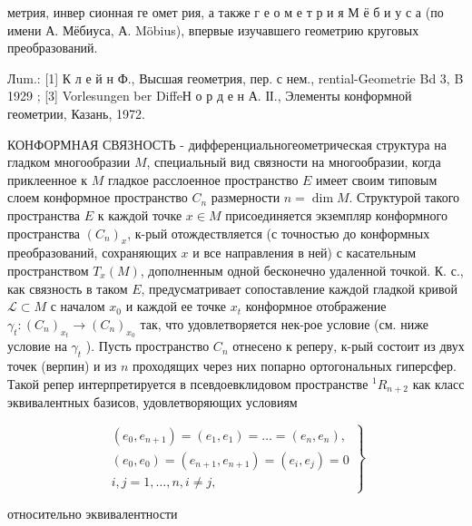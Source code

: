 \documentclass[10pt]{article}
\begin{document}
метрия, инвер сионная ге омет рия, а также г е о м е т р и я $М$ ё б и у с а (по имени А. Мёбиуса, А. Möbius), впервые изучавшего геометрию круговых преобразований.



Лum.: [1] К л е й н Ф., Высшая геометрия, пер. с нем., rential-Geometrie Bd 3, B 1929 ; [3] Vorlesungen ber DiffeН о р д е н А. ІІ., Элементы конформной геометрии, Казань, 1972.



КОНФОРМНАЯ СВЯЗНОСТЬ - дифференциальногеометрическая структура на гладком многообразии $M$, специальный вид связности на многообразии, когда приклеенное к $M$ гладкое расслоенное пространство $E$ имеет своим типовым слоем конформное пространство $C_{n}$ размерности $n=\operatorname{dim} M$. Структурой такого пространства $E$ к каждой точке $x \in M$ присоединяется экземпляр конформного пространства $\left(C_{n}\right)_{x}$, к-рый отождествляется (с точностью до конформных преобразований, сохраняющих $x$ и все направления в ней) с касательным пространством $T_{x}(M)$, дополненным одной бесконечно удаленной точкой. К. с., как связность в таком $E$, предусматривает сопоставление каждой гладкой кривой $\mathscr{L} \subset M$ с началом $x_{0}$ и каждой ее точке $x_{t}$ конформное отображение $\gamma_{t}:\left(C_{n}\right)_{x_{t}} \rightarrow\left(C_{n}\right)_{x_{0}}$ так, что удовлетворяется нек-рое условие (см. ниже условие на $\gamma_{t}$ ). Пусть пространство $C_{n}$ отнесено к реперу, к-рый состоит из двух точек (верпин) и из $n$ проходящих через них попарно ортогональных гиперсфер. Такой репер интерпретируется в псевдоевклидовом пространстве ${ }^{1} R_{n+2}$ как класс эквивалентных базисов, удовлетворяющих условиям



\[

\left.\begin{array}{c}

\left(e_{0}, e_{n+1}\right)=\left(e_{1}, e_{1}\right)=\ldots=\left(e_{n}, e_{n}\right), \\

\left(e_{0}, e_{0}\right)=\left(e_{n+1}, e_{n+1}\right)=\left(e_{i}, e_{j}\right)=0 \\

i, j=1, \ldots, n, i \neq j,

\end{array}\right\}

\]



относительно эквивалентности
\end{document}
